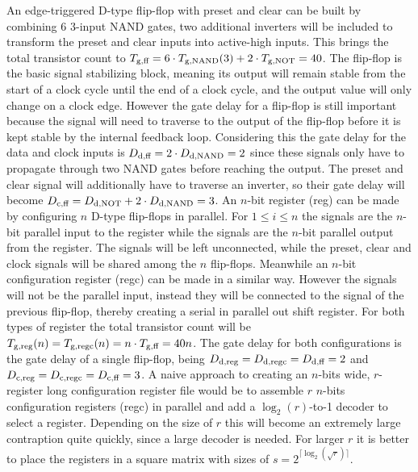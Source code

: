 \begin{itemize}
    An edge-triggered D-type flip-flop with preset and clear can be built by combining $6$ $3$-input NAND gates\cite{74x74}, two additional inverters will be included to transform the preset and clear inputs into active-high inputs. This brings the total transistor count to $\f{T}{g}{ff} = 6 \cdot \f{T}{g}{NAND}(3) + 2 \cdot \f{T}{g}{NOT} = 40$. The flip-flop is the basic signal stabilizing block, meaning its output will remain stable from the start of a clock cycle until the end of a clock cycle, and the output value will only change on a clock edge. However the gate delay for a flip-flop is still important because the signal will need to traverse to the output of the flip-flop before it is kept stable by the internal feedback loop. Considering this the gate delay for the data and clock inputs is $\f{D}{d}{ff} = 2 \cdot \f{D}{d}{NAND} = 2$ since these signals only have to propagate through two NAND gates before reaching the output. The preset and clear signal will additionally have to traverse an inverter, so their gate delay will become $\f{D}{c}{ff} = \f{D}{d}{NOT} + 2 \cdot \f{D}{d}{NAND} = 3$.
    An $n$-bit register (reg) can be made by configuring $n$ D-type flip-flops in parallel. For $1 \leq i \leq n$ the  signals are the $n$-bit parallel input to the register while the  signals are the $n$-bit parallel output from the register. The  signals will be left unconnected, while the preset, clear and clock signals will be shared among the $n$ flip-flops. Meanwhile an $n$-bit configuration register (regc) can be made in a similar way. However the  signals will not be the parallel input, instead they will be connected to the  signal of the previous flip-flop, thereby creating a serial in parallel out shift register\cite{74x165}. For both types of register the total transistor count will be $\f{T}{g}{reg}(n) = \f{T}{g}{regc}(n) = n \cdot \f{T}{g}{ff} = 40n$. The gate delay for both configurations is the gate delay of a single flip-flop, being $\f{D}{d}{reg} = \f{D}{d}{regc} = \f{D}{d}{ff} = 2$ and $\f{D}{c}{reg} = \f{D}{c}{regc} = \f{D}{c}{ff} = 3$.
    A naive approach to creating an $n$-bits wide, $r$-register long configuration register file would be to assemble $r$ $n$-bits configuration registers (regc) in parallel and add a $\log_{2}(r)$-to-1 decoder to select a register. Depending on the size of $r$ this will become an extremely large contraption quite quickly, since a large decoder is needed. For larger $r$ it is better to place the registers in a square matrix with sizes of $s = 2^{\lceil\log_{2}(\sqrt{r})\rceil}$. 
    

\end{itemize}
